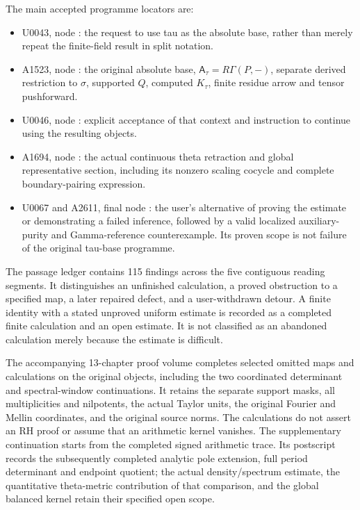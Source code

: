 The main accepted programme locators are:

\begin{itemize}
\tightlist
\item
  U0043, node \protect{}: the
  request to use tau as the absolute base, rather than merely repeat the
  finite-field result in split notation.
\item
  A1523, node \protect{}: the
  original absolute base, \(\mathsf A_\tau=R\Gamma(P,-)\), separate
  derived restriction to \(\sigma\), supported \(Q\), computed
  \(K_\tau\), finite residue arrow and tensor pushforward.
\item
  U0046, node \protect{}:
  explicit acceptance of that context and instruction to continue using
  the resulting objects.
\item
  A1694, node \protect{}: the
  actual continuous theta retraction and global representative section,
  including its nonzero scaling cocycle and complete boundary-pairing
  expression.
\item
  U0067 and A2611, final node
  \protect{}: the user's
  alternative of proving the estimate or demonstrating a failed
  inference, followed by a valid localized auxiliary-purity and
  Gamma-reference counterexample. Its proven scope is not failure of the
  original tau-base programme.
\end{itemize}

The passage ledger contains 115 findings across the five contiguous
reading segments. It distinguishes an unfinished calculation, a proved
obstruction to a specified map, a later repaired defect, and a
user-withdrawn detour. A finite identity with a stated unproved uniform
estimate is recorded as a completed finite calculation and an open
estimate. It is not classified as an abandoned calculation merely
because the estimate is difficult.

The accompanying 13-chapter proof volume completes selected omitted maps
and calculations on the original objects, including the two coordinated
determinant and spectral-window continuations. It retains the separate
support masks, all multiplicities and nilpotents, the actual Taylor
units, the original Fourier and Mellin coordinates, and the original
source norms. The calculations do not assert an RH proof or assume that
an arithmetic kernel vanishes. The supplementary continuation starts
from the completed signed arithmetic trace. Its postscript records the
subsequently completed analytic pole extension, full period determinant
and endpoint quotient; the actual density/spectrum estimate, the
quantitative theta-metric contribution of that comparison, and the
global balanced kernel retain their specified open scope.

